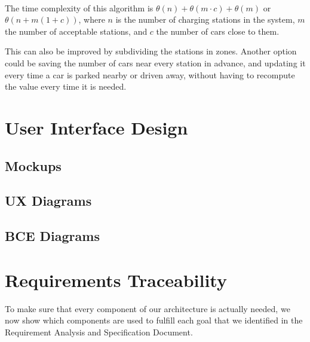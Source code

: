 \documentclass[english]{article}
\begin{document}
\begin{itemize}
\paragraph{}
The time complexity of this algorithm is $\theta(n) + \theta(m \cdot c) + \theta(m)$ or $\theta(n + m (1+c))$, where $n$ is the number of charging stations in the system, $m$ the number of acceptable stations, and $c$ the number of cars close to them.

This can also be improved by subdividing the stations in zones.
Another option could be saving the number of cars near every station in advance, and updating it every time a car is parked nearby or driven away, without having to recompute the value every time it is needed.

\newpage

\section{User Interface Design}

\subsection{Mockups}

\subsection{UX Diagrams}

\subsection{BCE Diagrams}

\newpage

\section{Requirements Traceability}
To make sure that every component of our architecture is actually needed, we now show which components are used to fulfill each goal that we identified in the Requirement Analysis and Specification Document.


\end{itemize}
\end{document}

